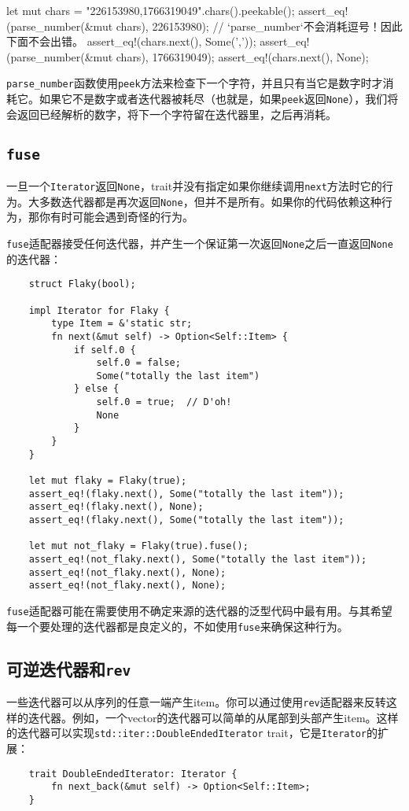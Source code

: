 let mut chars = "226153980,1766319049".chars().peekable();
assert_eq!(parse_number(&mut chars), 226153980);
// `parse_number`不会消耗逗号！因此下面不会出错。
assert_eq!(chars.next(), Some(','));
assert_eq!(parse_number(&mut chars), 1766319049);
assert_eq!(chars.next(), None);

\texttt{parse\_number}函数使用\texttt{peek}方法来检查下一个字符，并且只有当它是数字时才消耗它。如果它不是数字或者迭代器被耗尽（也就是，如果\texttt{peek}返回\texttt{None}），我们将会返回已经解析的数字，将下一个字符留在迭代器里，之后再消耗。

\subsection{\texttt{fuse}}\label{fuse}
一旦一个\texttt{Iterator}返回\texttt{None}，trait并没有指定如果你继续调用\texttt{next}方法时它的行为。大多数迭代器都是再次返回\texttt{None}，但并不是所有。如果你的代码依赖这种行为，那你有时可能会遇到奇怪的行为。

\texttt{fuse}适配器接受任何迭代器，并产生一个保证第一次返回\texttt{None}之后一直返回\texttt{None}的迭代器：
\begin{verbatim}
    struct Flaky(bool);

    impl Iterator for Flaky {
        type Item = &'static str;
        fn next(&mut self) -> Option<Self::Item> {
            if self.0 {
                self.0 = false;
                Some("totally the last item")
            } else {
                self.0 = true;  // D'oh!
                None
            }
        }
    }

    let mut flaky = Flaky(true);
    assert_eq!(flaky.next(), Some("totally the last item"));
    assert_eq!(flaky.next(), None);
    assert_eq!(flaky.next(), Some("totally the last item"));

    let mut not_flaky = Flaky(true).fuse();
    assert_eq!(not_flaky.next(), Some("totally the last item"));
    assert_eq!(not_flaky.next(), None);
    assert_eq!(not_flaky.next(), None);
\end{verbatim}

\texttt{fuse}适配器可能在需要使用不确定来源的迭代器的泛型代码中最有用。与其希望每一个要处理的迭代器都是良定义的，不如使用\texttt{fuse}来确保这种行为。

\subsection{可逆迭代器和\texttt{rev}}
一些迭代器可以从序列的任意一端产生item。你可以通过使用\texttt{rev}适配器来反转这样的迭代器。例如，一个vector的迭代器可以简单的从尾部到头部产生item。这样的迭代器可以实现\texttt{std::iter::DoubleEndedIterator} trait，它是\texttt{Iterator}的扩展：
\begin{verbatim}
    trait DoubleEndedIterator: Iterator {
        fn next_back(&mut self) -> Option<Self::Item>;
    }
\end{verbatim}

